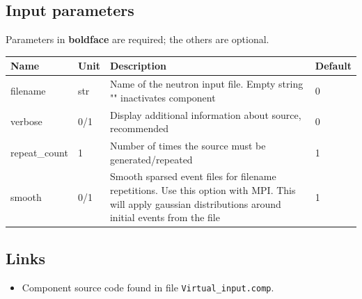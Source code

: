 \subsection*{Input parameters}
Parameters in \textbf{boldface} are required; the others are optional.

\begin{longtable}{p{}p{}p{}p{}}
\toprule
\textbf{Name} & \textbf{Unit} & \textbf{Description} & \textbf{Default} \\
\midrule
\endhead
filename & str & Name of the neutron input file. Empty string "" inactivates component & 0 \\
verbose & 0/1 & Display additional information about source, recommended & 0 \\
repeat\_count & 1 & Number of times the source must be generated/repeated & 1 \\
smooth & 0/1 & Smooth sparsed event files for filename repetitions. Use this option with MPI. This will apply gaussian distributions around initial events from the file & 1 \\
\bottomrule
\end{longtable}

\subsection*{Links}
\begin{itemize}
  \item Component source code found in file \texttt{Virtual\_input.comp}.
\end{itemize}
